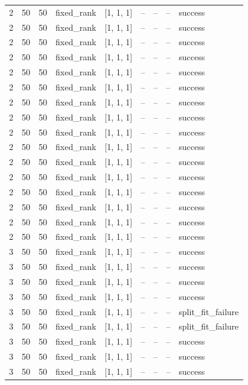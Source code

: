 \begin{longtable}{lllllllll}
2 & 50 & 50 & fixed\_rank & [1, 1, 1] & -- & -- & -- & success \\
2 & 50 & 50 & fixed\_rank & [1, 1, 1] & -- & -- & -- & success \\
2 & 50 & 50 & fixed\_rank & [1, 1, 1] & -- & -- & -- & success \\
2 & 50 & 50 & fixed\_rank & [1, 1, 1] & -- & -- & -- & success \\
2 & 50 & 50 & fixed\_rank & [1, 1, 1] & -- & -- & -- & success \\
2 & 50 & 50 & fixed\_rank & [1, 1, 1] & -- & -- & -- & success \\
2 & 50 & 50 & fixed\_rank & [1, 1, 1] & -- & -- & -- & success \\
2 & 50 & 50 & fixed\_rank & [1, 1, 1] & -- & -- & -- & success \\
2 & 50 & 50 & fixed\_rank & [1, 1, 1] & -- & -- & -- & success \\
2 & 50 & 50 & fixed\_rank & [1, 1, 1] & -- & -- & -- & success \\
2 & 50 & 50 & fixed\_rank & [1, 1, 1] & -- & -- & -- & success \\
2 & 50 & 50 & fixed\_rank & [1, 1, 1] & -- & -- & -- & success \\
2 & 50 & 50 & fixed\_rank & [1, 1, 1] & -- & -- & -- & success \\
2 & 50 & 50 & fixed\_rank & [1, 1, 1] & -- & -- & -- & success \\
2 & 50 & 50 & fixed\_rank & [1, 1, 1] & -- & -- & -- & success \\
2 & 50 & 50 & fixed\_rank & [1, 1, 1] & -- & -- & -- & success \\
3 & 50 & 50 & fixed\_rank & [1, 1, 1] & -- & -- & -- & success \\
3 & 50 & 50 & fixed\_rank & [1, 1, 1] & -- & -- & -- & success \\
3 & 50 & 50 & fixed\_rank & [1, 1, 1] & -- & -- & -- & success \\
3 & 50 & 50 & fixed\_rank & [1, 1, 1] & -- & -- & -- & success \\
3 & 50 & 50 & fixed\_rank & [1, 1, 1] & -- & -- & -- & split\_fit\_failure \\
3 & 50 & 50 & fixed\_rank & [1, 1, 1] & -- & -- & -- & split\_fit\_failure \\
3 & 50 & 50 & fixed\_rank & [1, 1, 1] & -- & -- & -- & success \\
3 & 50 & 50 & fixed\_rank & [1, 1, 1] & -- & -- & -- & success \\
3 & 50 & 50 & fixed\_rank & [1, 1, 1] & -- & -- & -- & success \\

\end{longtable}

